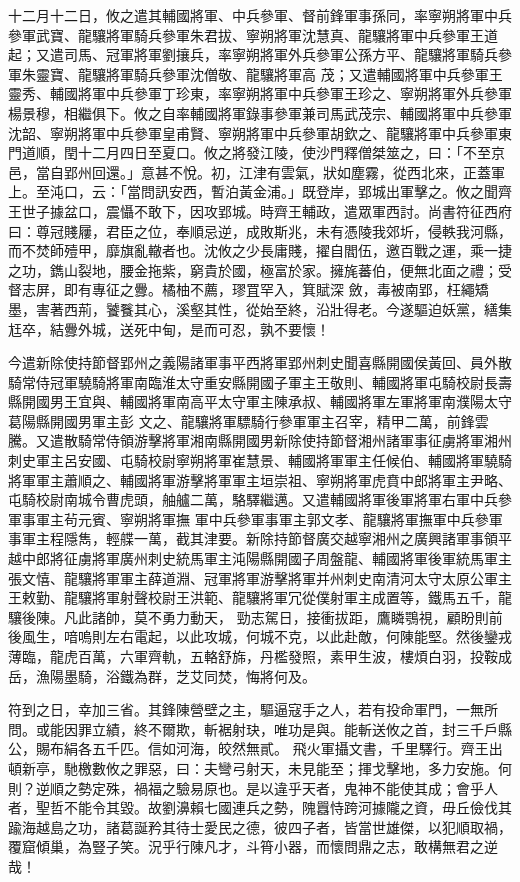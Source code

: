 \begin{pinyinscope}
 十二月十二日，攸之遣其輔國將軍、中兵參軍、督前鋒軍事孫同，率寧朔將軍中兵參軍武寶、龍驤將軍騎兵參軍朱君拔、寧朔將軍沈慧真、龍驤將軍中兵參軍王道起；又遣司馬、冠軍將軍劉攘兵，率寧朔將軍外兵參軍公孫方平、龍驤將軍騎兵參軍朱靈寶、龍驤將軍騎兵參軍沈僧敬、龍驤將軍高
 茂；又遣輔國將軍中兵參軍王靈秀、輔國將軍中兵參軍丁珍東，率寧朔將軍中兵參軍王珍之、寧朔將軍外兵參軍楊景穆，相繼俱下。攸之自率輔國將軍錄事參軍兼司馬武茂宗、輔國將軍中兵參軍沈韶、寧朔將軍中兵參軍皇甫賢、寧朔將軍中兵參軍胡欽之、龍驤將軍中兵參軍東門道順，閏十二月四日至夏口。攸之將發江陵，使沙門釋僧桀筮之，曰：「不至京邑，當自郢州回還。」意甚不悅。初，江津有雲氣，狀如塵霧，從西北來，正蓋軍
 上。至沌口，云：「當問訊安西，暫泊黃金浦。」既登岸，郢城出軍擊之。攸之聞齊王世子據盆口，震懾不敢下，因攻郢城。時齊王輔政，遣眾軍西討。尚書符征西府曰：尊冠賤屨，君臣之位，奉順忌逆，成敗斯兆，未有憑陵我郊圻，侵軼我河縣，而不焚師殪甲，靡旗亂轍者也。沈攸之少長庸賤，擢自閻伍，邀百戰之運，乘一捷之功，鐫山裂地，腰金拖紫，窮貴於國，極富於家。擁旄蕃伯，便無北面之禮；受督志屏，即有專征之釁。橘柚不薦，璆罝罕入，箕賦深
 斂，毒被南郢，枉繩矯墨，害著西荊，饕餮其心，溪壑其性，從始至終，沿壯得老。今遂驅迫妖黨，繕集尪卒，結釁外城，送死中甸，是而可忍，孰不要懷！



 今遣新除使持節督郢州之義陽諸軍事平西將軍郢州刺史聞喜縣開國侯黃回、員外散騎常侍冠軍驍騎將軍南臨淮太守重安縣開國子軍主王敬則、輔國將軍屯騎校尉長壽縣開國男王宜與、輔國將軍南高平太守軍主陳承叔、輔國將軍左軍將軍南濮陽太守葛陽縣開國男軍主彭
 文之、龍驤將軍驃騎行參軍軍主召宰，精甲二萬，前鋒雲騰。又遣散騎常侍領游擊將軍湘南縣開國男新除使持節督湘州諸軍事征虜將軍湘州刺史軍主呂安國、屯騎校尉寧朔將軍崔慧景、輔國將軍軍主任候伯、輔國將軍驍騎將軍軍主蕭順之、輔國將軍游擊將軍軍主垣崇祖、寧朔將軍虎賁中郎將軍主尹略、屯騎校尉南城令曹虎頭，舳艫二萬，駱驛繼邁。又遣輔國將軍後軍將軍右軍中兵參軍事軍主茍元賓、寧朔將軍撫
 軍中兵參軍事軍主郭文孝、龍驤將軍撫軍中兵參軍事軍主程隱雋，輕艓一萬，截其津要。新除持節督廣交越寧湘州之廣興諸軍事領平越中郎將征虜將軍廣州刺史統馬軍主沌陽縣開國子周盤龍、輔國將軍後軍統馬軍主張文憘、龍驤將軍軍主薛道淵、冠軍將軍游擊將軍并州刺史南清河太守太原公軍主王敕勤、龍驤將軍射聲校尉王洪範、龍驤將軍冗從僕射軍主成置等，鐵馬五千，龍驤後陳。凡此諸帥，莫不勇力動天，
 勁志駕日，接衝拔距，鷹瞵鶚視，顧盼則前後風生，喑嗚則左右電起，以此攻城，何城不克，以此赴敵，何陳能堅。然後鑾戎薄臨，龍虎百萬，六軍齊軌，五輅舒旆，丹檻發照，素甲生波，樓煩白羽，投鞍成岳，漁陽墨騎，浴鐵為群，芝艾同焚，悔將何及。



 符到之日，幸加三省。其鋒陳營壁之主，驅逼寇手之人，若有投命軍門，一無所問。或能因罪立績，終不爾欺，斬裾射玦，唯功是與。能斬送攸之首，封三千戶縣公，賜布絹各五千匹。信如河海，皎然無貳。
 飛火軍攝文書，千里驛行。齊王出頓新亭，馳檄數攸之罪惡，曰：夫彎弓射天，未見能至；揮戈擊地，多力安施。何則？逆順之勢定殊，禍福之驗易原也。是以違乎天者，鬼神不能使其成；會乎人者，聖哲不能令其毀。故劉濞賴七國連兵之勢，隗囂恃跨河據隴之資，毋丘儉伐其踰海越島之功，諸葛誕矜其待士愛民之德，彼四子者，皆當世雄傑，以犯順取禍，覆窟傾巢，為豎子笑。況乎行陳凡才，斗筲小器，而懷問鼎之志，敢構無君之逆哉！




\end{pinyinscope}
